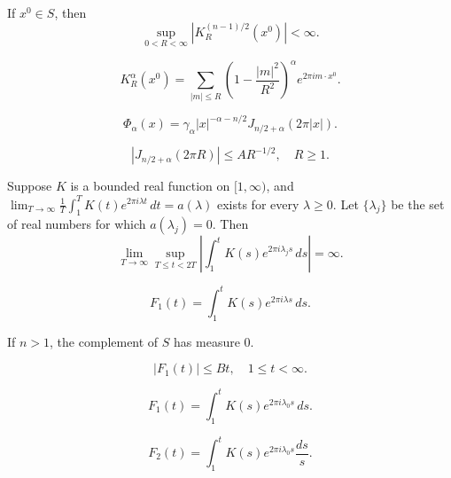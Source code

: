 \begin{lemma}\label{lem:c7-4-11}
If $x^0 \in S$, then
\[
\sup_{0 < R < \infty} |K_R^{(n-1)/2}(x^0)| < \infty.
\]
\end{lemma}

\begin{equation}\label{eq:c7-4-12}
K_R^\alpha(x^0) = \sum_{|m| \leq R} \left(1 - \frac{|m|^2}{R^2}\right)^\alpha e^{2\pi i m \cdot x^0}.
\end{equation}

\begin{equation}\label{eq:c7-4-13}
\Phi_\alpha(x) = \gamma_\alpha |x|^{-\alpha - n/2} J_{n/2 + \alpha}(2\pi |x|).
\end{equation}

\begin{equation}\label{eq:c7-4-14}
|J_{n/2 + \alpha}(2\pi R)| \leq A R^{-1/2}, \quad R \geq 1.
\end{equation}

\begin{lemma}\label{lem:c7-4-15}
Suppose $K$ is a bounded real function on $[1, \infty)$, and $\lim_{T \to \infty} \frac{1}{T} \int_1^T K(t) e^{2\pi i \lambda t}\,dt = a(\lambda)$ exists for every $\lambda \geq 0$. Let $\{\lambda_j\}$ be the set of real numbers for which $a(\lambda_j) = 0$. Then
\[
\lim_{T \to \infty} \sup_{T \leq t < 2T} \left| \int_1^t K(s) e^{2\pi i \lambda_j s}\,ds \right| = \infty.
\]
\end{lemma}

\begin{equation}\label{eq:c7-4-16}
F_1(t) = \int_1^t K(s) e^{2\pi i \lambda s}\,ds.
\end{equation}

\begin{lemma}\label{lem:c7-4-17}
If $n > 1$, the complement of $S$ has measure $0$.
\end{lemma}

\begin{equation}\label{eq:c7-4-18}
|F_1(t)| \leq B t, \quad 1 \leq t < \infty.
\end{equation}

\begin{equation}\label{eq:c7-4-19}
F_1(t) = \int_1^t K(s) e^{2\pi i \lambda_0 s}\,ds.
\end{equation}

\begin{equation}\label{eq:c7-4-20}
F_2(t) = \int_1^t K(s) e^{2\pi i \lambda_0 s} \frac{ds}{s}.
\end{equation}

